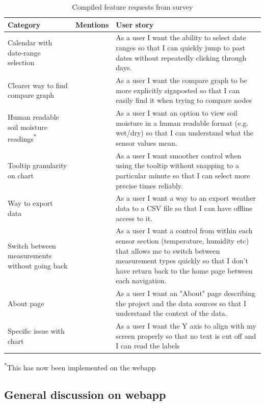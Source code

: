 \begin{table}[H]
  \centering
  \small
  \begin{tabularx}{\textwidth}{>{\RaggedRight\arraybackslash}p{}
  >{\centering\arraybackslash}p{1.5cm} >{\RaggedRight\arraybackslash}X}
    \hline
    Category & Mentions & User story \\
    \hline
    Calendar with date-range selection & 4 & As a user I want the ability to
    select date ranges so that I can quickly jump to past dates without
    repeatedly clicking through days. \\
    \hline
    Clearer way to find compare graph & 2 & As a user I want the compare graph
    to be more explicitly signposted so that I can easily find it when trying to
    compare nodes \\
    \hline
    Human readable soil moisture readings\textsuperscript{*} & 1 & As a user I
    want an option to view soil moisture in a human readable format (e.g.
    wet/dry) so that I can understand what the sensor values mean. \\
    \hline
    Tooltip granularity on chart & 1 & As a user I want smoother control when
    using the tooltip without snapping to a particular minute so that I can
    select more precise times reliably. \\
    \hline
    Way to export data  & 1 & As a user I want a way to an export weather data
    to a CSV file so that I can have offline access to it. \\
    \hline
    Switch between measurements without going back & 1 & As a user I want a
    control from within each sensor section (temperature, humidity etc) that
    allows me to switch between measurement types quickly so that I don't have
    return back to the home page between each navigation. \\
    \hline
    About page & 1 & As a user I want an "About" page describing the project and
    the data sources so that I understand the context of the data. \\
    \hline
    Specific issue with chart & 1 & As a user I want the Y axis to align with my
    screen properly so that no text is cut off and I can read the labels \\
    \hline
  \end{tabularx}
\noindent\textsuperscript{*}\small This has now been implemented on the webapp
\caption{Compiled feature requests from survey}
  \label{tab:feature-requests}
\end{table}

\subsection{General discussion on webapp}

